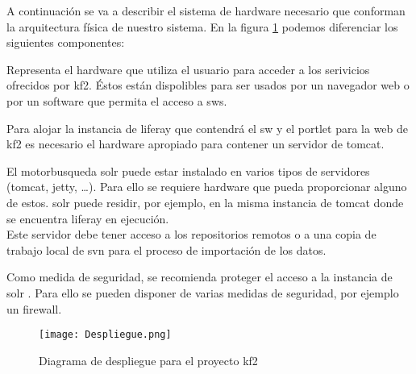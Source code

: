 
A continuación se va a describir el sistema de \gls{hardware} necesario que conforman la arquitectura física de nuestro sistema. En la figura \ref{image:deploview} podemos diferenciar los siguientes componentes:

\begin{itemize}

    Representa el \gls{hardware} que utiliza el usuario para acceder a los serivicios ofrecidos por \gls{kf2}. Éstos están dispolibles para ser usados por un navegador web o por un \gls{software} que permita el acceso a \glspl{sw}.
    
    Para alojar la instancia de \gls{liferay} que contendrá el \gls{sw} y el \gls{portlet} para la web de \gls{kf2} es necesario el \gls{hardware} apropiado para contener un servidor de \gls{tomcat}.
    
  El \gls{motorbusqueda} \gls{solr} puede estar instalado en varios tipos de servidores (\gls{tomcat}, \gls{jetty}, \dots). Para ello se requiere \gls{hardware} que pueda proporcionar alguno de estos. \Gls{solr} puede residir, por ejemplo, en la misma instancia de \gls{tomcat} donde se encuentra \gls{liferay} en ejecución.\\
  
  Este servidor debe tener acceso a los repositorios remotos o a una copia de trabajo local de \gls{svn} para el proceso de importación de los datos.
  
  Como medida de seguridad, se recomienda proteger el acceso a la instancia de \gls{solr} \cite{solrsecurity}. Para ello se pueden disponer de varias medidas de seguridad, por ejemplo un \gls{firewall}.
\end{itemize}

\begin{figure}[H]
  \centering
     \texttt{[image: Despliegue.png]}
  \caption{Diagrama de \gls{despliegue} para el proyecto \gls{kf2}}
  \label{image:deploview}
\end{figure}

